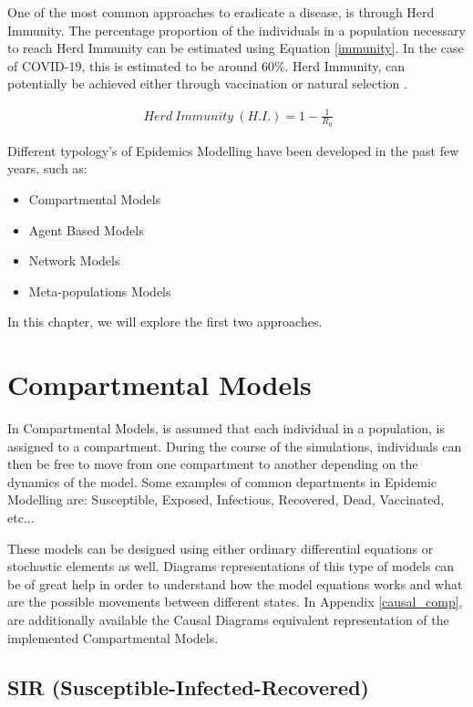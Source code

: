One of the most common approaches to eradicate a disease, is through Herd Immunity. The percentage proportion of the individuals in a population necessary to reach Herd Immunity can be estimated using Equation \ref{immunity}. In the case of COVID-19, this is estimated to be around 60\%. Herd Immunity, can potentially be achieved either through vaccination or natural selection \cite{blob}.

\useshortskip
\begin{align}
\ Herd\:Immunity\:(H.I.) = 1 - \frac{1}{R_{0}}
\label{immunity}
\end{align}
\useshortskip

Different typology's of Epidemics Modelling have been developed in the past few years, such as:
\begin{itemize}
    \setlength\itemsep{-0.3cm}
    \item Compartmental Models
    \item Agent Based Models
    \item Network Models
    \item Meta-populations Models
\end{itemize}

In this chapter, we will explore the first two approaches.

\section{Compartmental Models}

In Compartmental Models, is assumed that each individual in a population, is assigned to a compartment. During the course of the simulations, individuals can then be free to move from one compartment to another depending on the dynamics of the model. Some examples of common departments in Epidemic Modelling are: Susceptible, Exposed, Infectious, Recovered, Dead, Vaccinated, etc...

These models can be designed using either ordinary differential equations or stochastic elements as well. Diagrams representations of this type of models can be of great help in order to understand how the model equations works and what are the possible movements between different states. In Appendix \ref{causal_comp}, are additionally available the Causal Diagrams equivalent representation of the implemented Compartmental Models. 

\subsection{SIR (Susceptible-Infected-Recovered)}
\label{sir_sec}

